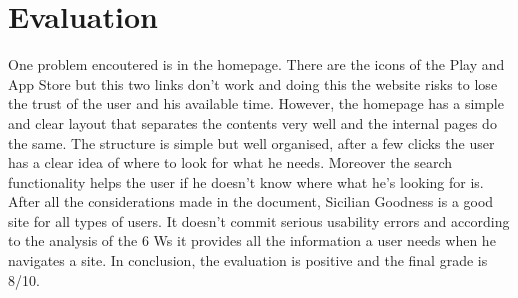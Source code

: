 \section{Evaluation}
One problem encoutered is in the homepage. There are the icons of the Play and App Store but this two links don't work and doing this the website risks to lose the trust of the user and his available time.
However, the homepage has a simple and clear layout that separates the contents very well and the internal pages do the same.
The structure is simple but well organised, after a few clicks the user has a clear idea of where to look for what he needs. 
Moreover the search functionality helps the user if he doesn't know where what he's looking for is. 
After all the considerations made in the document, Sicilian Goodness is a good site for all types of users. It doesn't commit serious usability errors and according to the analysis of the 6 Ws it provides all the information a user needs when he navigates a site. \newline
In conclusion, the evaluation is positive and the final grade is 8/10.

